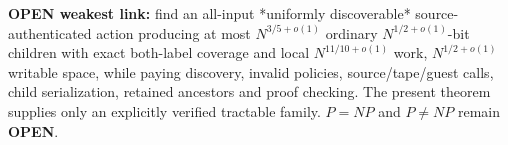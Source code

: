 \documentclass[11pt]{article}
\begin{document}
\textbf{OPEN weakest link:} find an all-input *uniformly discoverable* source-authenticated action producing at most $N^{3/5+o(1)}$ ordinary $N^{1/2+o(1)}$-bit children with exact both-label coverage and local $N^{11/10+o(1)}$ work, $N^{1/2+o(1)}$ writable space, while paying discovery, invalid policies, source/tape/guest calls, child serialization, retained ancestors and proof checking. The present theorem supplies only an explicitly verified tractable family. $P=NP$ and $P\ne NP$ remain \textbf{OPEN}.


\end{document}

